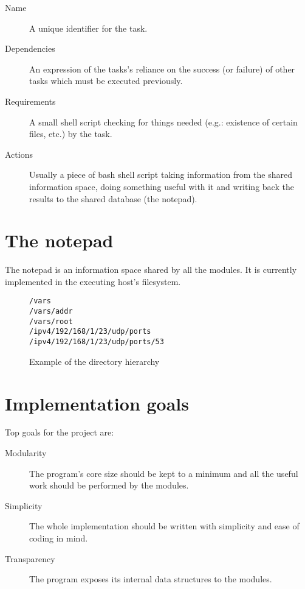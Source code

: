 \documentclass[a4paper,12pt]{book}
\begin{document}
\begin{description}

\item [Name] A unique identifier for the task.

\item [Dependencies] An expression of the tasks's reliance on the success (or
failure) of other tasks which must be executed previously.

\item [Requirements] A small shell script checking for things needed (e.g.:
existence of certain files, etc.) by the task.

\item [Actions] Usually a piece of bash shell script taking information from the
shared information space, doing something useful with it and writing back the
results to the shared database (the notepad).

\end{description}

\section{The notepad}

The notepad is an information space shared by all the modules. It is currently
implemented in the executing host's filesystem.

\begin{figure}[ht]
\begin{verbatim}
/vars
/vars/addr
/vars/root
/ipv4/192/168/1/23/udp/ports
/ipv4/192/168/1/23/udp/ports/53
\end{verbatim}
\caption{Example of the directory hierarchy}
\end{figure}

\section{Implementation goals}

Top goals for the project are:

\begin{description}

\item [Modularity] The program's core size should be kept to a minimum and all
the useful work should be performed by the modules.

\item [Simplicity] The whole implementation should be written with simplicity
and ease of coding in mind.

\item [Transparency] The program exposes its internal data structures to the
modules.

\end{description}
\end{document}
